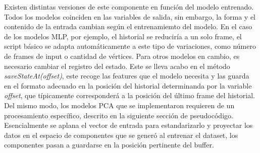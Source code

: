 Existen distintas versiones de este componente en función del modelo entrenado. Todos los modelos coinciden en las variables de salida, sin embargo, la forma y el contenido de la entrada cambian según el entrenamiemto del modelo. En el caso de los modelos MLP, por ejemplo, el historial se reduciría a un solo frame, el script básico se adapta automáticamente a este tipo de variaciones, como número de frames de input o cantidad de vértices. Para otros modelos en cambio, es necesario cambiar el registro del estado. Este se lleva acabo en el método \textit{saveStateAt(offset)}, este recoge las features que el modelo necesita y las guarda en el formato adecuado en la posición del historial determinanda por la variable \textit{offset}, que típicamente corresponderá a la posición del último frame del historial. Del mismo modo, los modelos PCA que se implementaron requieren de un procesamiento específico, descrito en la siguiente sección de pseudocódigo. Esencialmente se aplana el vector de entrada para estandarizarlo y proyectar los datos en el espacio de componentes que se generó al entrenar el dataset, los componentes pasan a guardarse en la posición pertinente del buffer.

